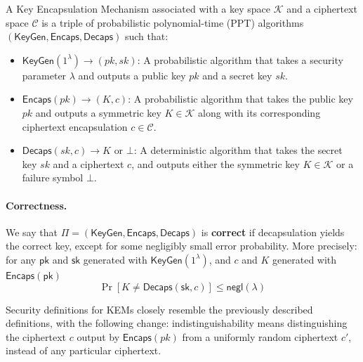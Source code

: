 \begin{definition}
A Key Encapsulation Mechanism associated with a key space $\mathcal{K}$ and a ciphertext space $\mathcal{C}$ is a triple of probabilistic polynomial-time (PPT) algorithms $(\mathsf{KeyGen}, \mathsf{Encaps}, \mathsf{Decaps})$ such that:

\begin{itemize}
    \item $\mathsf{KeyGen}(1^\lambda) \to (pk, sk)$: A probabilistic algorithm that takes a security parameter $\lambda$ and outputs a public key $pk$ and a secret key $sk$.
    
    \item $\mathsf{Encaps}(pk) \to (K, c)$: A probabilistic algorithm that takes the public key $pk$ and outputs a symmetric key $K \in \mathcal{K}$ along with its corresponding ciphertext encapsulation $c \in \mathcal{C}$.
    
    \item $\mathsf{Decaps}(sk, c) \to K \text{ or } \bot$: A deterministic algorithm that takes the secret key $sk$ and a ciphertext $c$, and outputs either the symmetric key $K \in \mathcal{K}$ or a failure symbol $\bot$.
\end{itemize}

\end{definition}

\paragraph{Correctness.}
We say that $\Pi = (\mathsf{KeyGen}, \mathsf{Encaps}, \mathsf{Decaps})$ is \textbf{correct} if decapsulation yields the correct key, except for some negligibly small error probability. More precisely: for any $\mathsf{pk}$ and $\mathsf{sk}$ generated with $\mathsf{KeyGen}(1^\lambda)$, and $c$ and $K$ generated with $\mathsf{Encaps}(\mathsf{pk})$
\[
\Pr \left[ K \neq \mathsf{Decaps}(\mathsf{sk}, c) \right] \le \mathsf{negl}(\lambda)
\]

Security definitions for KEMs closely resemble the previously described definitions, with the following change: indistinguishability means distinguishing the ciphertext $c$ output by $\mathsf{Encaps}(pk)$ from a uniformly random ciphertext $c'$, instead of any particular ciphertext.


